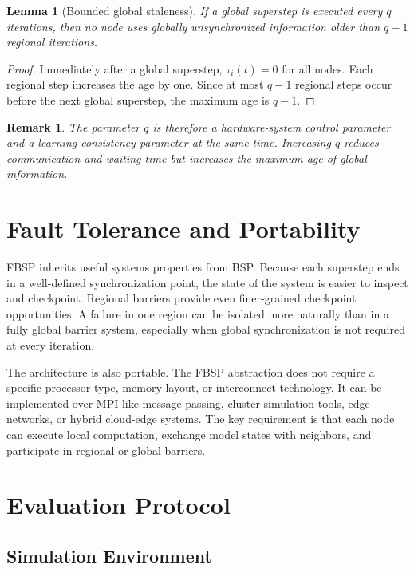 ﻿\documentclass[10pt,journal]{IEEEtran}
\newtheorem{lemma}{Lemma}
\newtheorem{remark}{Remark}
\begin{document}
	\begin{lemma}[Bounded global staleness]
		If a global superstep is executed every $q$ iterations, then no node uses globally unsynchronized information older than $q-1$ regional iterations.
	\end{lemma}
	
	\begin{proof}
		Immediately after a global superstep, $\tau_i(t)=0$ for all nodes. Each regional step increases the age by one. Since at most $q-1$ regional steps occur before the next global superstep, the maximum age is $q-1$.
	\end{proof}
	
	\begin{remark}
		The parameter $q$ is therefore a hardware-system control parameter and a learning-consistency parameter at the same time. Increasing $q$ reduces communication and waiting time but increases the maximum age of global information.
	\end{remark}
	
	\section{Fault Tolerance and Portability}
	
	FBSP inherits useful systems properties from BSP. Because each superstep ends in a well-defined synchronization point, the state of the system is easier to inspect and checkpoint. Regional barriers provide even finer-grained checkpoint opportunities. A failure in one region can be isolated more naturally than in a fully global barrier system, especially when global synchronization is not required at every iteration.
	
	The architecture is also portable. The FBSP abstraction does not require a specific processor type, memory layout, or interconnect technology. It can be implemented over MPI-like message passing, cluster simulation tools, edge networks, or hybrid cloud-edge systems. The key requirement is that each node can execute local computation, exchange model states with neighbors, and participate in regional or global barriers.
	
	\section{Evaluation Protocol}
	
	\subsection{Simulation Environment}
	
\end{document}

